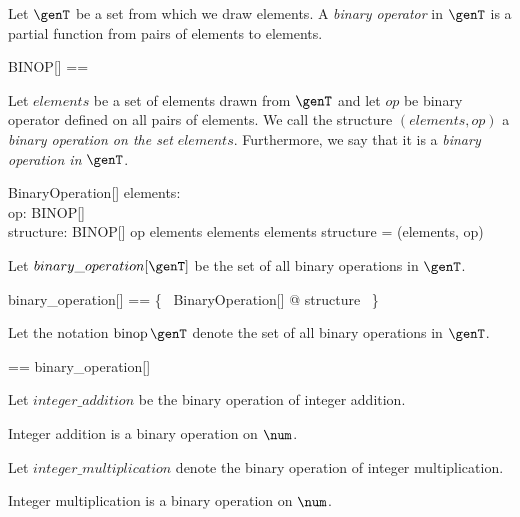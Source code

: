 \documentclass{amsart}
\begin{document}
Let $\genT$ be a set from which we draw elements.
A \textit{binary operator} in $\genT$ is a partial function from pairs of elements to elements.
\begin{zed}
	BINOP[\genT] == \genT \cross \genT \pfun \genT
\end{zed}

Let $elements$ be a set of elements drawn from $\genT$ and
let $op$ be binary operator defined on all pairs of elements.
We call the structure $(elements, op)$ a \textit{binary operation on the set} $elements$.
Furthermore, we say that it is a \textit{binary operation in} $\genT$.

\begin{schema}{BinaryOperation}[\genT]
	elements: \power \genT \\
	op: BINOP[\genT] \\
	structure: \power \genT \cross BINOP[\genT]
\where
	op \in elements \cross elements \fun elements
\also
	structure = (elements, op)
\end{schema}

Let $binary\_operation[\genT]$ be the set of all binary operations in $\genT$.
\begin{zed}
	binary\_operation[\genT] == \{~ BinaryOperation[\genT] @ structure ~\}
\end{zed}

Let the notation $\binop \genT$ denote the set of all binary operations in $\genT$.
\begin{zed}
	\binop \genT == binary\_operation[\genT]
\end{zed}

Let $integer\_addition$ be the binary operation of integer addition.

\begin{example}
Integer addition is a binary operation on $\num$.
\end{example}

Let $integer\_multiplication$ denote the binary operation of integer multiplication.

\begin{example}
Integer multiplication is a binary operation on $\num$.
\end{example}
\end{document}
